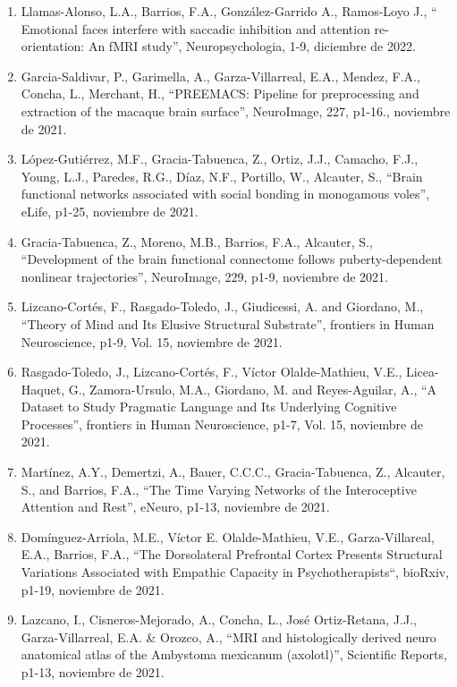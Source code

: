 \begin{enumerate}
\item Llamas-Alonso, L.A., Barrios, F.A., González-Garrido A., Ramos-Loyo J., “ Emotional faces interfere with saccadic inhibition and attention re-orientation: 
An fMRI study”, Neuropsychologia, 1-9,  diciembre de 2022.

\item Garcia-Saldivar, P., Garimella, A., Garza-Villarreal, E.A., Mendez, F.A., Concha, L., Merchant, H., “PREEMACS: Pipeline for preprocessing and extraction of 
the macaque brain surface”, NeuroImage, 227, p1-16.,  noviembre de 2021.

\item López-Gutiérrez, M.F., Gracia-Tabuenca, Z., Ortiz, J.J., Camacho, F.J., Young, L.J., Paredes, R.G., Díaz, N.F., Portillo, W., Alcauter, S., “Brain 
functional networks associated with social bonding in monogamous voles”, eLife, p1-25,  noviembre de 2021.

\item Gracia-Tabuenca, Z., Moreno, M.B., Barrios, F.A., Alcauter, S., “Development of the brain functional connectome follows puberty-dependent nonlinear 
trajectories”, NeuroImage, 229, p1-9,  noviembre de 2021.

\item Lizcano-Cortés, F., Rasgado-Toledo, J., Giudicessi, A. and Giordano, M., “Theory of Mind and Its Elusive Structural Substrate”, frontiers in Human 
Neuroscience, p1-9, Vol. 15,  noviembre de 2021.

\item Rasgado-Toledo, J., Lizcano-Cortés, F., Víctor Olalde-Mathieu, V.E., Licea-Haquet, G., Zamora-Ursulo, M.A., Giordano, M. and Reyes-Aguilar, A., “A 
Dataset 
to Study Pragmatic Language and Its Underlying Cognitive Processes”, frontiers in Human Neuroscience, p1-7, Vol. 15,  noviembre de 2021.

\item Martínez, A.Y., Demertzi, A., Bauer, C.C.C., Gracia-Tabuenca, Z., Alcauter, S., and Barrios, F.A., “The Time Varying Networks of the Interoceptive 
Attention and Rest”, eNeuro, p1-13,  noviembre de 2021.

\item Domínguez-Arriola, M.E., Víctor E. Olalde-Mathieu, V.E., Garza-Villareal, E.A., Barrios, F.A., “The Dorsolateral Prefrontal Cortex Presents Structural 
Variations Associated with Empathic Capacity in Psychotherapists“, bioRxiv, p1-19,  noviembre de 2021.

\item Lazcano, I., Cisneros-Mejorado, A., Concha, L., José Ortiz-Retana, J.J., Garza-Villarreal, E.A. \& Orozco, A., “MRI and histologically derived neuro 
anatomical atlas of the Ambystoma mexicanum (axolotl)”, Scientific Reports, p1-13,  noviembre de 2021.


\end{enumerate}
